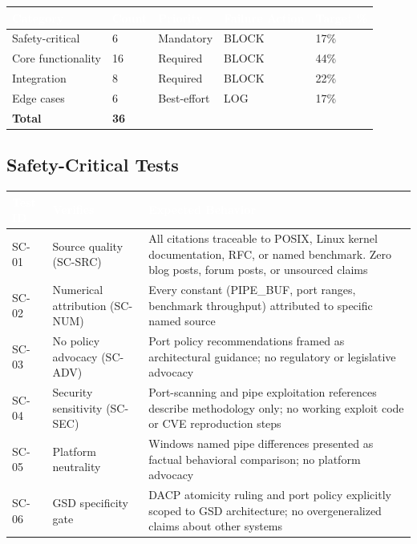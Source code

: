 \documentclass[11pt,letterpaper]{article}
\newcommand{\tableheader}[1]{\textbf{\sffamily\textcolor{white}{#1}}}
\begin{document}
\begin{center}
\begin{tabularx}{\textwidth}{L{3cm}C{1.5cm}L{2cm}L{2cm}C{2cm}}
\toprule
{}
\tableheader{Category} & \tableheader{Count} & \tableheader{Priority} & \tableheader{Failure Action} & \tableheader{Target \%} \\
\midrule
Safety-critical & 6 & Mandatory & BLOCK & 17\% \\
Core functionality & 16 & Required & BLOCK & 44\% \\
Integration & 8 & Required & BLOCK & 22\% \\
Edge cases & 6 & Best-effort & LOG & 17\% \\
\midrule
\textbf{Total} & \textbf{36} & & & \\
\bottomrule
\end{tabularx}
\end{center}

\subsection{Safety-Critical Tests}

\begin{center}
\begin{tabularx}{\textwidth}{C{1.5cm}L{3.5cm}X}
\toprule
{}
\tableheader{Test ID} & \tableheader{Verifies} & \tableheader{Expected Behavior} \\
\midrule
SC-01 & Source quality (SC-SRC) & All citations traceable to POSIX, Linux kernel documentation, RFC, or named benchmark. Zero blog posts, forum posts, or unsourced claims \\
SC-02 & Numerical attribution (SC-NUM) & Every constant (PIPE\_BUF, port ranges, benchmark throughput) attributed to specific named source \\
SC-03 & No policy advocacy (SC-ADV) & Port policy recommendations framed as architectural guidance; no regulatory or legislative advocacy \\
SC-04 & Security sensitivity (SC-SEC) & Port-scanning and pipe exploitation references describe methodology only; no working exploit code or CVE reproduction steps \\
SC-05 & Platform neutrality & Windows named pipe differences presented as factual behavioral comparison; no platform advocacy \\
SC-06 & GSD specificity gate & DACP atomicity ruling and port policy explicitly scoped to GSD architecture; no overgeneralized claims about other systems \\
\bottomrule
\end{tabularx}
\end{center}
\end{document}
